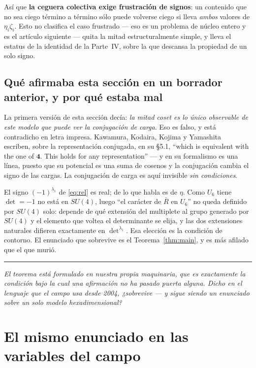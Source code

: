 \documentclass[11pt,a4paper]{article}
\newcommand{\su}[1]{SU(#1)}
\newcommand{\bridge}[1]{\par\medskip\noindent
  \textcolor{hdrblue!45}{\rule{2.2cm}{0.6pt}}\;\;\parbox[t]{0.84\textwidth}{\small\itshape
  \textcolor{hdrblue!85}{#1}}\par\medskip}
\begin{document}
\noindent Así que \textbf{la ceguera colectiva exige frustración de signos}: un contenido que no sea
ciego término a término sólo puede volverse ciego si lleva \emph{ambos} valores de $\eta_i\zeta_i$.
Esto no clasifica el caso frustrado --- eso es un problema de núcleo entero y es el artículo
siguiente --- quita la mitad estructuralmente simple, y lleva el estatus de la identidad de la
Parte~IV, sobre la que descansa la propiedad de un solo signo.

\subsection*{Qué afirmaba esta sección en un borrador anterior, y por qué estaba mal}

La primera versión de esta sección decía: \emph{la mitad coset es lo único observable de este modelo
que puede ver la conjugación de carga}. Eso es falso, y está contradicho en letra impresa. Kawamura,
Kodaira, Kojima y Yamashita~\cite{KKKY} escriben, sobre la representación conjugada, en su \S5.1,
``which is equivalent with the one of $\mathbf 4$. This holds for any representation'' --- y en su
formalismo es una línea, puesto que su potencial es una suma de cosenos y la conjugación cambia el
signo de las cargas. La conjugación de carga es aquí invisible \emph{sin condiciones}.

El signo $(-1)^{\lambda_1}$ de \eqref{eq:rel} es real; de lo que habla es de $\eta$. Como $U_6$ tiene
$\det=-1$ no está en $\su4$, luego ``el carácter de $\bar R$ en $U_6$'' no queda definido por $\su4$
solo: depende de qué extensión del multiplete al grupo generado por $\su4$ y el elemento que voltea
el determinante se elija, y las dos extensiones naturales difieren exactamente en $\det^{\lambda_1}$.
Esa elección es la condición de contorno. El enunciado que sobrevive es el
Teorema~\ref{thm:main}, y es más afilado que el que murió.

\bridge{El teorema está formulado en nuestra propia maquinaria, que es exactamente la condición bajo
la cual una afirmación no ha pasado puerta alguna. Dicho en el lenguaje que el campo usa desde 2004,
¿sobrevive --- y sigue siendo un enunciado sobre un solo modelo hexadimensional?}

\section{El mismo enunciado en las variables del campo}\label{sec:hhk}
\end{document}
